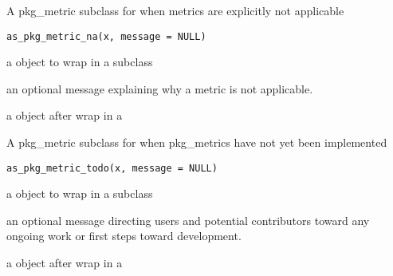 \documentclass[a4paper]{book}
\begin{document}
%
\begin{Description}
A pkg\_metric subclass for when metrics are explicitly not applicable
\end{Description}
%
\begin{Usage}
\begin{verbatim}
as_pkg_metric_na(x, message = NULL)
\end{verbatim}
\end{Usage}
%
\begin{Arguments}
\begin{ldescription}
\item[\code{x}] a  object to wrap in a 
subclass

\item[\code{message}] an optional message explaining why a metric is not applicable.
\end{ldescription}
\end{Arguments}
%
\begin{Value}
a  object after wrap in a 
\end{Value}
%
\begin{Description}
A pkg\_metric subclass for when pkg\_metrics have not yet been implemented
\end{Description}
%
\begin{Usage}
\begin{verbatim}
as_pkg_metric_todo(x, message = NULL)
\end{verbatim}
\end{Usage}
%
\begin{Arguments}
\begin{ldescription}
\item[\code{x}] a  object to wrap in a 
subclass

\item[\code{message}] an optional message directing users and potential contributors
toward any ongoing work or first steps toward development.
\end{ldescription}
\end{Arguments}
%
\begin{Value}
a  object after wrap in a 
\end{Value}
\end{document}

